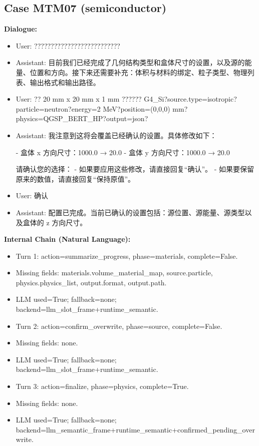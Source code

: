 \documentclass[11pt]{ctexart}
\begin{document}
\subsection{Case MTM07 (semiconductor)}
\textbf{Dialogue:}
\begin{itemize}
\item User: ??????????????????????????
\item Assistant: 目前我们已经完成了几何结构类型和盒体尺寸的设置，以及源的能量、位置和方向。接下来还需要补充：体积与材料的绑定、粒子类型、物理列表、输出格式和输出路径。
\item User: ?? 20 mm x 20 mm x 1 mm ?????? G4\_Si?source.type=isotropic?particle=neutron?energy=2 MeV?position=(0,0,0) mm?physics=QGSP\_BERT\_HP?output=json?
\item Assistant: 我注意到这将会覆盖已经确认的设置。具体修改如下：

- 盒体 x 方向尺寸：1000.0 → 20.0
- 盒体 y 方向尺寸：1000.0 → 20.0

请确认您的选择：
- 如果要应用这些修改，请直接回复“确认”。
- 如果要保留原来的数值，请直接回复“保持原值”。
\item User: 确认
\item Assistant: 配置已完成。当前已确认的设置包括：源位置、源能量、源类型以及盒体的 z 方向尺寸。
\end{itemize}
\textbf{Internal Chain (Natural Language):}
\begin{itemize}
\item Turn 1: action=summarize\_progress, phase=materials, complete=False.
\item Missing fields: materials.volume\_material\_map, source.particle, physics.physics\_list, output.format, output.path.
\item LLM used=True; fallback=none; backend=llm\_slot\_frame+runtime\_semantic.
\item Turn 2: action=confirm\_overwrite, phase=source, complete=False.
\item Missing fields: none.
\item LLM used=True; fallback=none; backend=llm\_slot\_frame+runtime\_semantic.
\item Turn 3: action=finalize, phase=physics, complete=True.
\item Missing fields: none.
\item LLM used=True; fallback=none; backend=llm\_semantic\_frame+runtime\_semantic+confirmed\_pending\_overwrite.
\end{itemize}
\end{document}
